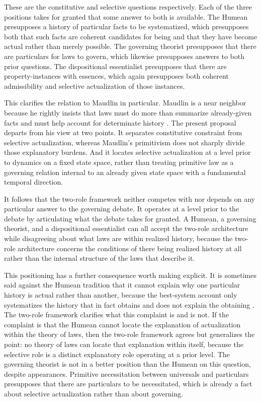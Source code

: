 \documentclass[11pt]{article}
\theoremstyle{foundation}
\begin{document}
These are the constitutive and selective questions respectively. Each of the three positions takes for granted that some answer to both is available. The Humean presupposes a history of particular facts to be systematized, which presupposes both that such facts are coherent candidates for being and that they have become actual rather than merely possible. The governing theorist presupposes that there are particulars for laws to govern, which likewise presupposes answers to both prior questions. The dispositional essentialist presupposes that there are property-instances with essences, which again presupposes both coherent admissibility and selective actualization of those instances.

This clarifies the relation to Maudlin in particular. Maudlin is a near neighbor because he rightly insists that laws must do more than summarize already-given facts and must help account for determinate history \citep{Maudlin2007}. The present proposal departs from his view at two points. It separates constitutive constraint from selective actualization, whereas Maudlin's primitivism does not sharply divide those explanatory burdens. And it locates selective actualization at a level prior to dynamics on a fixed state space, rather than treating primitive law as a governing relation internal to an already given state space with a fundamental temporal direction.

It follows that the two-role framework neither competes with nor depends on any particular answer to the governing debate. It operates at a level prior to the debate by articulating what the debate takes for granted. A Humean, a governing theorist, and a dispositional essentialist can all accept the two-role architecture while disagreeing about what laws are within realized history, because the two-role architecture concerns the conditions of there being realized history at all rather than the internal structure of the laws that describe it.

This positioning has a further consequence worth making explicit. It is sometimes said against the Humean tradition that it cannot explain why one particular history is actual rather than another, because the best-system account only systematizes the history that in fact obtains and does not explain the obtaining \citep{Maudlin2007}. The two-role framework clarifies what this complaint is and is not. If the complaint is that the Humean cannot locate the explanation of actualization within the theory of laws, then the two-role framework agrees but generalizes the point: no theory of laws can locate that explanation within itself, because the selective role is a distinct explanatory role operating at a prior level. The governing theorist is not in a better position than the Humean on this question, despite appearances. Primitive necessitation between universals and particulars presupposes that there are particulars to be necessitated, which is already a fact about selective actualization rather than about governing.
\end{document}
